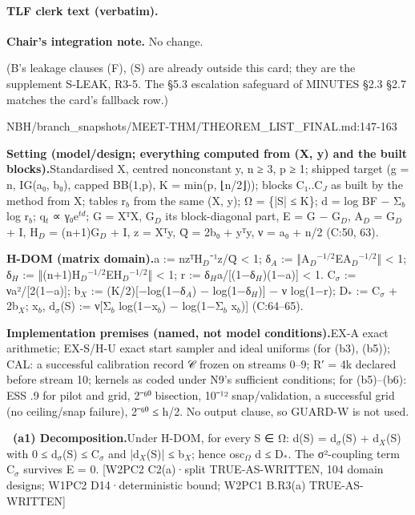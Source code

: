 \paragraph{TLF clerk text (verbatim).}
\par\noindent \textbf{Chair's integration note.} No change.
\par\noindent (B's leakage clauses (F), (S) are already outside this card; they are the supplement S-LEAK, R3-5. The §5.3 escalation safeguard of MINUTES §2.3 §2.7 matches the card's fallback row.)

\begin{stmt}{NBH/branch_snapshots/MEET-THM/THEOREM_LIST_FINAL.md:147-163}
\par\smallskip\noindent\textbf{Setting (model/design; everything computed from (X, y) and the built blocks).}\enspace Standardised X, centred nonconstant y, n ≥ 3, p ≥ 1; shipped target (g = n, IG(a₀, b₀), capped BB(1,p), K = min(p, ⌊n/2⌋)); blocks C₁..C$_{J}$ as built by the method from X; tables r$_{b}$ from the same (X, y); Ω = \{|S| ≤ K\}; d = log BF − Σ$_{b}$ log r$_{b}$; q$_{t}$ ∝ γ₀e$^{td}$; G = XᵀX, G$_{D}$ its block-diagonal part, E = G − G$_{D}$, A$_{D}$ = G$_{D}$ + I, H$_{D}$ = (n+1)G$_{D}$ + I, z = Xᵀy, Q̄ = 2b₀ + yᵀy, ν = a₀ + n/2 (C:50, 63).
\par\smallskip\noindent\textbf{H-DOM (matrix domain).}\enspace a := nzᵀH$_{D}$⁻¹z/Q̄ \textless{} 1; δ$_{A}$ := ‖A$_{D}$$^{−1/2}$EA$_{D}$$^{−1/2}$‖ \textless{} 1; δ$_{H}$ := ‖(n+1)H$_{D}$$^{−1/2}$EH$_{D}$$^{−1/2}$‖ \textless{} 1; r := δ$_{H}$a/[(1−δ$_{H}$)(1−a)] \textless{} 1. C$_{σ}$ := νa²/[2(1−a)]; b$_{X}$ := (K/2)[−log(1−δ$_{A}$) − log(1−δ$_{H}$)] − ν log(1−r); D$_{*}$ := C$_{σ}$ + 2b$_{X}$; x$_{b}$, d$_{σ}$(S) := ν[Σ$_{b}$ log(1−x$_{b}$) − log(1−Σ$_{b}$ x$_{b}$)] (C:64–65).
\par\smallskip\noindent\textbf{Implementation premises (named, not model conditions).}\enspace EX-A exact arithmetic; EX-S/H-U exact start sampler and ideal uniforms (for (b3), (b5)); CAL: a successful calibration record 𝒞 frozen on streams 0–9; R′ = 4k declared before stream 10; kernels as coded under N9's sufficient conditions; for (b5)–(b6): ESS .9 for pilot and grid, 2⁻⁶⁰ bisection, 10⁻¹² snap/validation, a successful grid (no ceiling/snap failure), 2⁻⁶⁰ ≤ h/2. No output clause, so GUARD-W is not used.
\par\smallskip\noindent\textbf{\ (a1) Decomposition.}\enspace Under H-DOM, for every S ∈ Ω: d(S) = d$_{σ}$(S) + d$_{X}$(S) with 0 ≤ d$_{σ}$(S) ≤ C$_{σ}$ and |d$_{X}$(S)| ≤ b$_{X}$; hence osc$_{Ω}$ d ≤ D$_{*}$. The σ²-coupling term C$_{σ}$ survives E = 0. [W2PC2 C2(a)·split TRUE-AS-WRITTEN, 104 domain designs; W1PC2 D14·deterministic bound; W2PC1 B.R3(a) TRUE-AS-WRITTEN]

\end{stmt}
